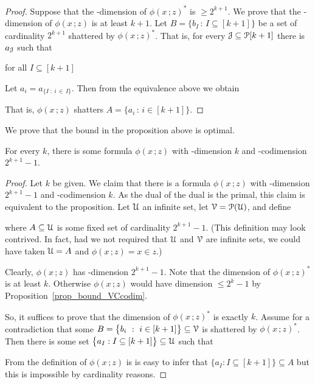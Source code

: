 \documentclass[scombinatorics.tex]{subfiles}
\begin{document}
\begin{proof}
  Suppose that the \vc-dimension of $\phi(x\,;z)^*$ is $\ge 2^{k+1}$.
  We prove that the \vc-dimension of $\phi(x\,;z)$ is at least $k+1$.
  Let $B=\big\{b_I\,:\,I\subseteq [k+1]\big\}$ be a set of cardinality $2^{k+1}$ shattered by $\phi(x\,;z)^*$. 
  That is, for every $\EuScript J\subseteq \EuScript P[k+1]$ there is $a_\EuScript J$ such that
  
  \hfill for all $I\subseteq [k+1]$
  
  Let $a_i=a_{\{I\; :\ i\,\in\, I\}}$. Then from the equivalence above we obtain
  
  
  That is, $\phi(x\,;z)$ shatters $A=\big\{a_i\,:\, i\in [k+1]\big\}$.
\end{proof}

We prove that the bound in the proposition above is optimal.

\begin{proposition}
  For every $k$, there is some formula $\phi(x\,;z)$ with \vc-dimension $k$ and \vc-codimension $2^{k+1}-1$.
\end{proposition}
\begin{proof}
  Let $k$ be given.
  We claim that there is a formula $\phi(x\,;z)$ with \vc-dimension $2^{k+1}-1$ and \vc-codimension $k$.
  As the dual of the dual is the primal, this claim is equivalent to the proposition.
  Let $\EuScript U$ an infinite set, let $\EuScript V=\EuScript P(\EuScript U)$, and define
  
  
  where $A\subseteq\EuScript U$ is some fixed set of cardinality $2^{k+1}-1$. (This definition may look contrived. In fact, had we not required that $\EuScript U$ and $\EuScript V$ are infinite sets, we could have taken $\EuScript U=A$ and $\phi(x\,;z)=x\in z$.)

  Clearly, $\phi(x\,;z)$ has \vc-dimension $2^{k+1}-1$.
  Note that the dimension of $\phi(x\,;z)^*$ is at least $k$.
  Otherwise $\phi(x\,;z)$ would have dimension $\le2^k-1$ by Proposition~\ref{prop_bound_VCcodim}.
  
  So, it suffices to prove that the dimension of $\phi(x\,;z)^*$ is exactly $k$.
  Assume for a contradiction that some $B=\big\{b_i\ :\ i\in[k+1]\big\}\subseteq\EuScript V$ is shattered by $\phi(x\,;z)^*$.
  Then there is some set $\big\{a_I:I\subseteq[k+1]\big\}\subseteq\EuScript U$ such that
  

  From the definition of $\phi(x\,;z)$ is is easy to infer that $\big\{a_I:I\subseteq[k+1]\big\}\subseteq A$ but this is impossible by cardinality reasons.
\end{proof}
\end{document}
